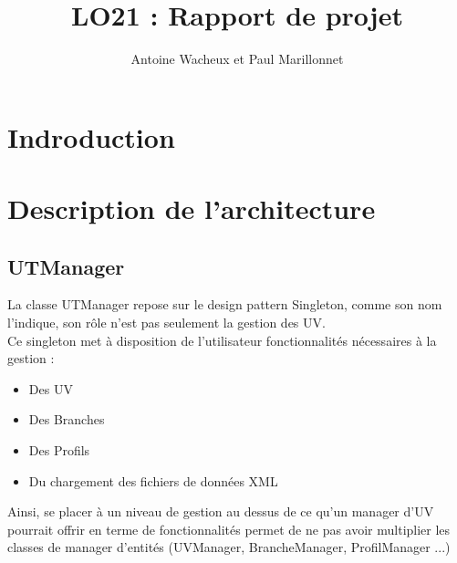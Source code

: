 \documentclass[a4paper,10pt,french]{report}
\begin{document}
\author{Antoine Wacheux et Paul Marillonnet}
\title{LO21 : Rapport de projet}\maketitle

\tableofcontents



\section*{Indroduction}\label{sec:Introduction}



\section{Description de l'architecture}\label{sec:I}



	\subsection{UTManager}\label{subsec:UTManager}
	
	La classe UTManager repose sur le design pattern Singleton, comme son nom l'indique, son rôle n'est pas seulement la gestion des UV. \\
	Ce singleton met à disposition de l'utilisateur fonctionnalités nécessaires à la gestion :
	\begin{itemize}
	\item Des UV
	\item Des Branches
	\item Des Profils
	\item Du chargement des fichiers de données XML	
	\end{itemize}
	Ainsi, se placer à un niveau de gestion au dessus de ce qu'un manager d'UV pourrait offrir en terme de fonctionnalités permet de ne pas avoir multiplier les classes de manager d'entités (UVManager, BrancheManager, ProfilManager ...)
	
		\subsubsection{}
			\paragraph{}
			\paragraph{}
\end{document}
